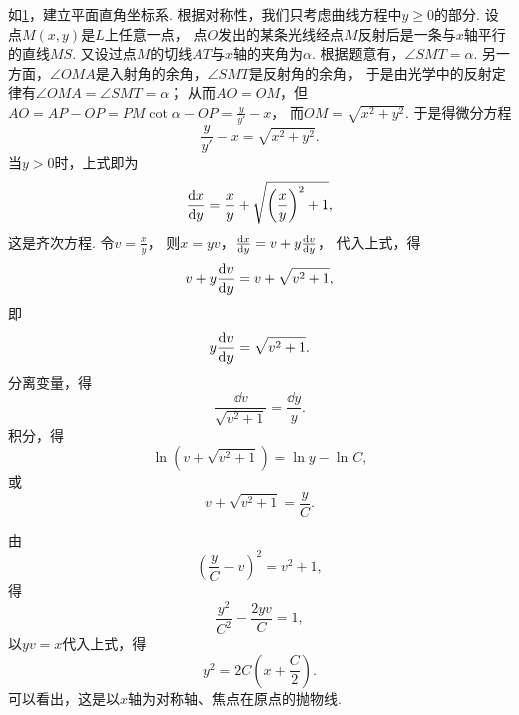 \begin{example}
\begin{figure}[htb]
	\caption{}
	\label{figure:微分方程.齐次方程.例图1}
\end{figure}
\begin{solution}
如\cref{figure:微分方程.齐次方程.例图1}，建立平面直角坐标系.
根据对称性，我们只考虑曲线方程中\(y\geq0\)的部分.
设点\(M(x,y)\)是\(L\)上任意一点，
点\(O\)发出的某条光线经点\(M\)反射后是一条与\(x\)轴平行的直线\(MS\).
又设过点\(M\)的切线\(AT\)与\(x\)轴的夹角为\(\alpha\).
根据题意有，\(\angle SMT = \alpha\).
另一方面，\(\angle OMA\)是入射角的余角，\(\angle SMT\)是反射角的余角，
于是由光学中的反射定律有\(\angle OMA = \angle SMT = \alpha\)；
从而\(AO = OM\)，但\(AO = AP - OP = PM \cot\alpha - OP = \frac{y}{y'} - x\)，
而\(OM = \sqrt{x^2+y^2}\).
于是得微分方程\begin{equation*}
	\frac{y}{y'} - x = \sqrt{x^2+y^2}.
\end{equation*}
当\(y>0\)时，上式即为\begin{equation*}
	\dv{x}{y} = \frac{x}{y} + \sqrt{\left(\frac{x}{y}\right)^2 + 1},
\end{equation*}
这是齐次方程.
令\(v = \frac{x}{y}\)，
则\(x = yv\)，\(\dv{x}{y} = v + y \dv{v}{y}\)，
代入上式，得\begin{equation*}
	v + y \dv{v}{y} = v + \sqrt{v^2 + 1},
\end{equation*}
即\begin{equation*}
	y \dv{v}{y} = \sqrt{v^2 + 1}.
\end{equation*}
分离变量，得\begin{equation*}
	\frac{\dd{v}}{\sqrt{v^2+1}}
	= \frac{\dd{y}}{y}.
\end{equation*}
积分，得\begin{equation*}
	\ln(v+\sqrt{v^2+1}) = \ln y - \ln C,
\end{equation*}
或\begin{equation*}
	v + \sqrt{v^2+1} = \frac{y}{C}.
\end{equation*}

由\begin{equation*}
\left(\frac{y}{C} - v\right)^2 = v^2 + 1,
\end{equation*}得\begin{equation*}
	\frac{y^2}{C^2} - \frac{2yv}{C} = 1,
\end{equation*}
以\(yv=x\)代入上式，得\begin{equation*}
	y^2 = 2C(x+\frac{C}{2}).
\end{equation*}
可以看出，这是以\(x\)轴为对称轴、焦点在原点的抛物线.
\end{solution}
\end{example}


